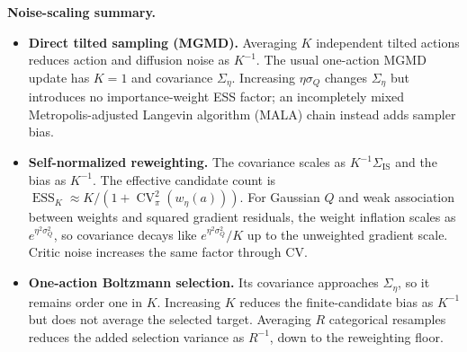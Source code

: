 \documentclass[10pt]{article}
\newcommand{\ESS}{\operatorname{ESS}}
\newcommand{\IS}{\mathrm{IS}}
\begin{document}
\textbf{Noise-scaling summary.}
\begin{itemize}
\setlength{\itemsep}{1pt}
\setlength{\topsep}{2pt}
\setlength{\parsep}{0pt}
\setlength{\parskip}{0pt}
\item \textbf{Direct tilted sampling (MGMD).}
Averaging $K$ independent tilted actions reduces action and diffusion noise as
$K^{-1}$.  The usual one-action MGMD update has $K=1$ and covariance
$\Sigma_\eta$.  Increasing $\eta\sigma_Q$ changes $\Sigma_\eta$ but introduces
no importance-weight ESS factor; an incompletely mixed Metropolis-adjusted
Langevin algorithm (MALA) chain instead adds sampler bias.
\item \textbf{Self-normalized reweighting.}
The covariance scales as $K^{-1}\Sigma_{\IS}$ and the bias as $K^{-1}$.  The
effective candidate count is
$\ESS_K\approx K/(1+\operatorname{CV}_\pi^2(w_\eta(a)))$.  For Gaussian $Q$ and
weak association between weights and squared gradient residuals, the weight
inflation scales as $e^{\eta^2\sigma_Q^2}$, so covariance decays like
$e^{\eta^2\sigma_Q^2}/K$ up to the unweighted gradient scale.  Critic noise
increases the same factor through CV.
\item \textbf{One-action Boltzmann selection.}
Its covariance approaches $\Sigma_\eta$, so it remains order one in $K$.
Increasing $K$ reduces the finite-candidate bias as $K^{-1}$ but does not average
the selected target.  Averaging $R$ categorical resamples reduces the added
selection variance as $R^{-1}$, down to the reweighting floor.
\end{itemize}
\end{document}

